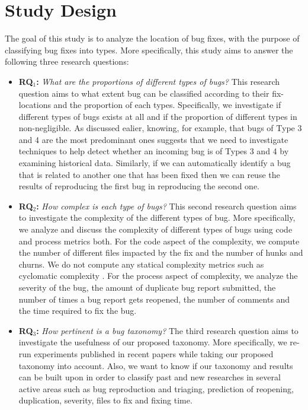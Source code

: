 
\section{Study Design}

The goal of this study is to analyze the location of bug fixes, with the purpose of classifying bug fixes into types.
More specifically, this study aims to answer the following three research questions:

\begin{itemize}
	\item {\bf RQ$_1$:} {\it What are the proportions of different types of bugs?} This research question aims to what extent bug can be classified according to their fix-locations and the proportion of each types.
  Specifically, we investigate if different types of bugs exists at all and if the proportion of different types in non-negligible.
  As discussed ealier, knowing, for example, that bugs of Type 3 and 4 are the most predominant ones suggests that we need to investigate techniques to help detect whether an incoming bug is of Types 3 and 4 by examining historical data.
  Similarly, if we can automatically identify a bug that is related to another one that has been fixed then we can reuse the results of reproducing the first bug in reproducing the second one.

	\item {\bf RQ$_2$:} {\it How complex is each type of bugs?} This second research question aims to investigate the complexity of the different types of bug.
  More specifically, we analyze and discuss the complexity of different types of bugs using code and process metrics both.
  For the code aspect of the complexity, we compute the number of different files impacted by the fix and the number of hunks and churns.
  We do not compute any statical complexity metrics such as cyclomatic complexity \cite{McCabe1989}.
  For the process aspect of complexity, we analyze the severity of the bug, the amount of duplicate bug report submitted, the number of times a bug report gets reopened, the number of comments and the time required to fix the bug.

	\item {\bf RQ$_3$:} {\it How pertinent is a bug taxonomy?} The third research question aims to investigate the usefulness of our proposed taxonomy.
	More specifically, we re-run experiments published in recent papers while taking our proposed taxonomy into account.
	Also, we want to know if our taxonomy and results can be built upon in order to classify past and new researches in several active areas such as bug reproduction and triaging, prediction of reopening, duplication, severity, files to fix and fixing time.


\end{itemize}





